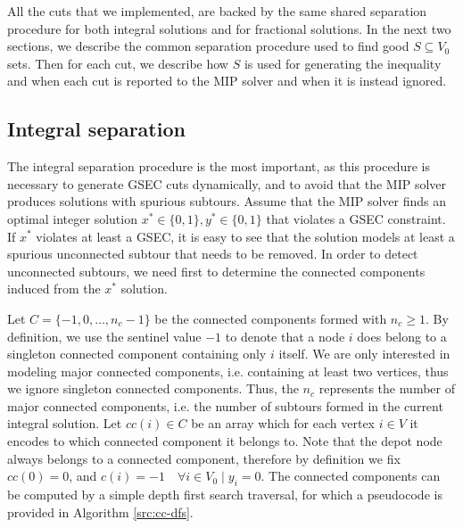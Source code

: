 All the cuts that we implemented, are backed by the same shared separation procedure for both integral solutions and for fractional solutions.
In the next two sections, we describe the common separation procedure used to find good $S \subseteq V_0$ sets.
Then for each cut, we describe how $S$ is used for generating the inequality and when each cut is reported to the MIP solver and when it is instead ignored.

\subsection{Integral separation}
The integral separation procedure is the most important, as this procedure is necessary to generate GSEC cuts dynamically, and to avoid that the MIP solver produces solutions with spurious subtours.
Assume that the MIP solver finds an optimal integer solution $x^* \in \{0, 1\}, y^* \in \{0, 1\}$ that violates a GSEC constraint.
If $x^*$ violates at least a GSEC, it is easy to see that the solution models at least a spurious unconnected subtour that needs to be removed.
In order to detect unconnected subtours, we need first to determine the connected components induced from the $x^*$ solution.

Let $C = \{-1, 0, \dots, n_c - 1\}$ be the connected components formed with $n_c \ge 1$.
By definition, we use the sentinel value $-1$ to denote that a node $i$ does belong to a singleton connected component containing only $i$ itself.
We are only interested in modeling major connected components, i.e. containing at least two vertices, thus we ignore singleton connected components.
Thus, the $n_c$ represents the number of major connected components, i.e. the number of subtours formed in the current integral solution.
Let $cc(i) \in C$ be an array which for each vertex $i \in V$ it encodes to which connected component it belongs to.
Note that the depot node always belongs to a connected component, therefore by definition we fix $cc(0) = 0$, and $c(i) = -1  \quad \forall i \in V_0 \mid y_i = 0$.
The connected components can be computed by a simple depth first search traversal, for which a pseudocode is provided in Algorithm \ref{src:cc-dfs}.

